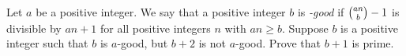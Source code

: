 Let $a$ be a positive integer. We say that a positive integer $b$ is \textit{-good} if $\tbinom{an}{b}-1$ is divisible by $an+1$ for all positive integers $n$ with $an \geq b$. Suppose $b$ is a positive integer such that $b$ is $a$-good, but $b+2$ is not $a$-good. Prove that $b+1$ is prime.